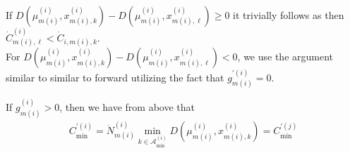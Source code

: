 \documentclass{article}
\begin{document}
If $D(\mu^{(i)}_{m(i)},x^{(i)}_{m(i),k})-D(\mu^{(i)}_{m(i)},x^{(i)}_{m(i),\ell})\geq 0$ it trivially follows as then $\dot{C}^{(i)}_{m(i),\ell}<\dot{C}_{i,m(i),k}$. \\
For $D(\mu^{(i)}_{m(i)},x^{(i)}_{m(i),k})-D(\mu^{(i)}_{m(i)},x^{(i)}_{m(i),\ell})<0$, we use the argument similar to similar to \cite{bandyopadhyay2024optimal} forward utilizing the fact that $g^{'(i)}_{m(i)}=0$.



If $g^{(i)}_{m(i)}>0$, then we have from above that
\begin{align*}
    C_{\min}^{'(i)} = \dot{N}^{(i)}_{m(i)}\min_{k\in\mathcal{A}^{(i)}_{\min}}D(\mu^{(i)}_{m(i)},x^{(i)}_{m(i),k}) = C_{\min}^{'(j)}
\end{align*}



\end{document}
